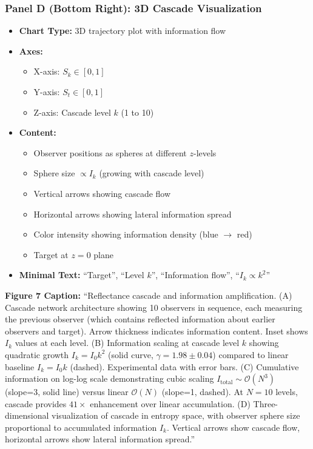 \subsubsection*{Panel D (Bottom Right): 3D Cascade Visualization}
\begin{itemize}
\item \textbf{Chart Type:} 3D trajectory plot with information flow
\item \textbf{Axes:}
  \begin{itemize}
  \item X-axis: $S_k \in [0,1]$
  \item Y-axis: $S_t \in [0,1]$
  \item Z-axis: Cascade level $k$ (1 to 10)
  \end{itemize}
\item \textbf{Content:}
  \begin{itemize}
  \item Observer positions as spheres at different $z$-levels
  \item Sphere size $\propto I_k$ (growing with cascade level)
  \item Vertical arrows showing cascade flow
  \item Horizontal arrows showing lateral information spread
  \item Color intensity showing information density (blue $\to$ red)
  \item Target at $z=0$ plane
  \end{itemize}
\item \textbf{Minimal Text:} ``Target'', ``Level $k$'', ``Information flow'', ``$I_k \propto k^2$''
\end{itemize}

\textbf{Figure 7 Caption:}
``Reflectance cascade and information amplification. (A) Cascade network architecture showing 10 observers in sequence, each measuring the previous observer (which contains reflected information about earlier observers and target). Arrow thickness indicates information content. Inset shows $I_k$ values at each level. (B) Information scaling at cascade level $k$ showing quadratic growth $I_k = I_0 k^2$ (solid curve, $\gamma=1.98\pm 0.04$) compared to linear baseline $I_k = I_0 k$ (dashed). Experimental data with error bars. (C) Cumulative information on log-log scale demonstrating cubic scaling $I_{\text{total}} \sim \mathcal{O}(N^3)$ (slope=3, solid line) versus linear $\mathcal{O}(N)$ (slope=1, dashed). At $N=10$ levels, cascade provides $41\times$ enhancement over linear accumulation. (D) Three-dimensional visualization of cascade in entropy space, with observer sphere size proportional to accumulated information $I_k$. Vertical arrows show cascade flow, horizontal arrows show lateral information spread.''

